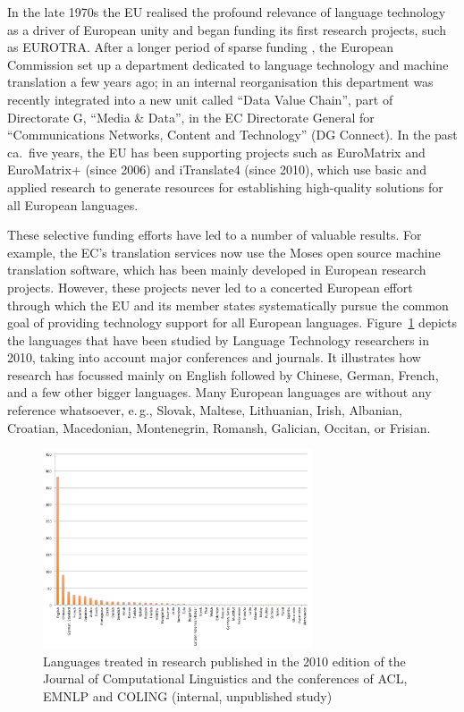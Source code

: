 \documentclass[10pt, plain]{../../metanetpaper}
\begin{document}
\begin{multicols}{2}
In the late 1970s the EU realised the profound relevance of language technology as a driver of European unity and began funding its first research projects, such as EUROTRA. After a longer period of sparse funding \cite{laz1,euromap}, the European Commission set up a department dedicated to language technology and machine translation a few years ago; in an internal reorganisation this department was recently integrated into a new unit called ``Data Value Chain'', part of Directorate G, ``Media \& Data'', in the EC Directorate General for ``Communications Networks, Content and Technology'' (DG Connect). In the past ca.~five years, the EU has been supporting projects such as EuroMatrix and EuroMatrix+ (since 2006) and iTranslate4 (since 2010), which use basic and applied research to generate resources for establishing high-quality solutions for all European languages.

These selective funding efforts have led to a number of valuable results. For example, the EC's translation services now use the Moses open source machine translation software, which has been mainly developed in European research projects. However, these projects never led to a concerted European effort through which the EU and its member states systematically pursue the common goal of providing technology support for all European languages. Figure~\ref{fig:languages-in-research} depicts the languages that have been studied by Language Technology researchers in 2010, taking into account major conferences and journals. It illustrates how research has focussed mainly on English followed by Chinese, German, French, and a few other bigger languages. Many European languages are without any reference whatsoever, e.\,g., Slovak, Maltese, Lithuanian, Irish, Albanian, Croatian, Macedonian, Montenegrin, Romansh, Galician, Occitan, or Frisian.

\begin{figure}[htb]
  \center
  \includegraphics[width=0.71\textwidth]{../_media/Languages-in-LT-Research}
  \caption{Languages treated in research published in the 2010 edition of the Journal of Computational Linguistics and the conferences of ACL, EMNLP and COLING (internal, unpublished study)}
  \label{fig:languages-in-research}
\end{figure}


\end{multicols}
\end{document}
